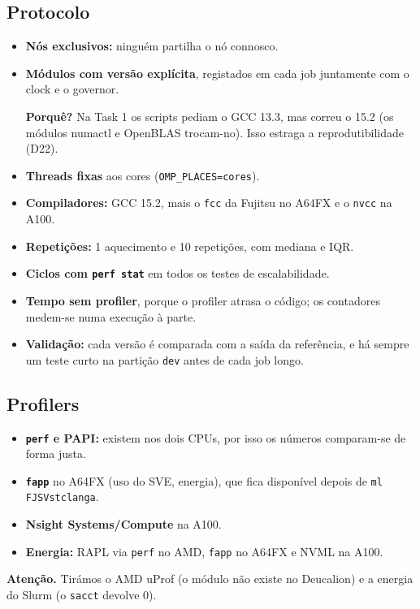\documentclass[11pt,a4paper]{article}
\newcommand{\porque}[1]{\par\noindent\colorbox{blue!6}{\parbox{\dimexpr\linewidth-2\fboxsep}{\small\textbf{Porquê?} #1}}\par}
\newcommand{\cuidado}[1]{\par\noindent\colorbox{orange!10}{\parbox{\dimexpr\linewidth-2\fboxsep}{\small\textbf{Atenção.} #1}}\par}
\begin{document}
\subsection{Protocolo}
\begin{itemize}
\item \textbf{Nós exclusivos:} ninguém partilha o nó connosco.
\item \textbf{Módulos com versão explícita}, registados em cada job juntamente com o clock e o governor.
\porque{Na Task 1 os scripts pediam o GCC 13.3, mas correu o 15.2 (os módulos numactl e OpenBLAS
trocam-no). Isso estraga a reprodutibilidade (D22).}
\item \textbf{Threads fixas} aos cores (\texttt{OMP\_PLACES=cores}).
\item \textbf{Compiladores:} GCC 15.2, mais o \texttt{fcc} da Fujitsu no A64FX e o \texttt{nvcc} na A100.
\item \textbf{Repetições:} 1 aquecimento e 10 repetições, com mediana e IQR.
\item \textbf{Ciclos com \texttt{perf stat}} em todos os testes de escalabilidade.
\item \textbf{Tempo sem profiler}, porque o profiler atrasa o código; os contadores medem-se numa
execução à parte.
\item \textbf{Validação:} cada versão é comparada com a saída da referência, e há sempre um teste curto
na partição \texttt{dev} antes de cada job longo.
\end{itemize}

\subsection{Profilers}
\begin{itemize}
\item \textbf{\texttt{perf} e PAPI:} existem nos dois CPUs, por isso os números comparam-se de forma
justa.
\item \textbf{\texttt{fapp}} no A64FX (uso do SVE, energia), que fica disponível depois de
\texttt{ml FJSVstclanga}.
\item \textbf{Nsight Systems/Compute} na A100.
\item \textbf{Energia:} RAPL via \texttt{perf} no AMD, \texttt{fapp} no A64FX e NVML na A100.
\end{itemize}
\cuidado{Tirámos o AMD uProf (o módulo não existe no Deucalion) e a energia do Slurm (o \texttt{sacct}
devolve 0).}
\end{document}
